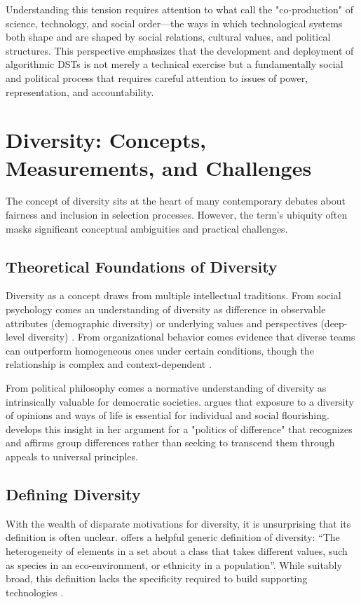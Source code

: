 Understanding this tension requires attention to what \textcite{jasanoff2004states} call the "co-production" of science, technology, and social order—the ways in which technological systems both shape and are shaped by social relations, cultural values, and political structures. This perspective emphasizes that the development and deployment of algorithmic DSTs is not merely a technical exercise but a fundamentally social and political process that requires careful attention to issues of power, representation, and accountability.

\section{Diversity: Concepts, Measurements, and Challenges}\label{sec:diversity_background}

The concept of diversity sits at the heart of many contemporary debates about fairness and inclusion in selection processes. However, the term's ubiquity often masks significant conceptual ambiguities and practical challenges.

\subsection{Theoretical Foundations of Diversity}\label{ssec:diversity_theory}
Diversity as a concept draws from multiple intellectual traditions. From social psychology comes an understanding of diversity as difference in observable attributes (demographic diversity) or underlying values and perspectives (deep-level diversity) \cite{harrison1998time}. From organizational behavior comes evidence that diverse teams can outperform homogeneous ones under certain conditions, though the relationship is complex and context-dependent \cite{williams2013demography}.

From political philosophy comes a normative understanding of diversity as intrinsically valuable for democratic societies. \textcite{mill1859liberty} argues that exposure to a diversity of opinions and ways of life is essential for individual and social flourishing. \textcite{young1990justice} develops this insight in her argument for a "politics of difference" that recognizes and affirms group differences rather than seeking to transcend them through appeals to universal principles.

\subsection{Defining Diversity}\label{ssec:defining_diversity}
With the wealth of disparate motivations for diversity, it is unsurprising that its definition is often unclear. \textcite{page_diversity_2010} offers a helpful generic definition of diversity: ``The heterogeneity of elements in a set about a class that takes different values, such as species in an eco-environment, or ethnicity in a population''. While suitably broad, this definition lacks the specificity required to build supporting technologies \cite{hupont2021diverse,page_diversity_2010}.

